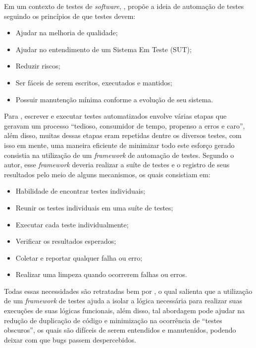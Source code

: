         Em um contexto de testes de \textit{software}, , propõe a ideia de automação de testes seguindo os princípios de que testes devem:

        \begin{itemize}

        \item Ajudar na melhoria de qualidade;
        \item Ajudar no entendimento de um Sistema Em Teste (SUT);
        \item Reduzir riscos;
        \item Ser fáceis de serem escritos, executados e mantidos;
        \item Possuir manutenção mínima conforme a evolução de seu sistema.

        \end{itemize}

        Para , escrever e executar testes automatizados envolve várias etapas que geravam um processo “tedioso, consumidor de tempo, propenso a erros e caro”, além disso, muitas dessas etapas eram repetidas dentre os diversos testes, com isso em mente, uma maneira eficiente de minimizar todo este esforço gerado consistia na utilização de um \textit{framework} de automação de testes. Segundo o autor, esse \textit{framework} deveria realizar a suíte de testes e o registro de seus resultados pelo meio de alguns mecanismos, os quais consistiam em:

        \begin{itemize}

        \item Habilidade de encontrar testes individuais;
        \item Reunir os testes individuais em uma suíte de testes;
        \item Executar cada teste individualmente;
        \item Verificar os resultados esperados;
        \item Coletar e reportar qualquer falha ou erro;
        \item Realizar uma limpeza quando ocorrerem falhas ou erros.

        \end{itemize}

        Todas essas necessidades são retratadas bem por , o qual salienta que a utilização de um \textit{framework} de testes ajuda a isolar a lógica necessária para realizar suas execuções de suas lógicas funcionais, além disso, tal abordagem pode ajudar na redução de duplicação de código e minimização na ocorrência de “testes obscuros”, os quais são difíceis de serem entendidos e manutenidos, podendo deixar com que bugs passem despercebidos.
